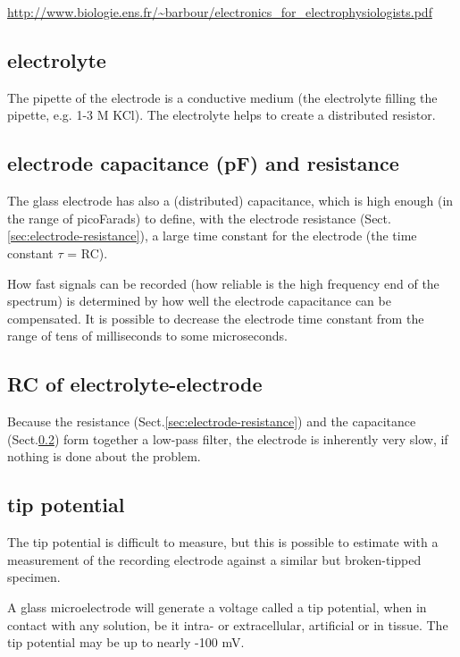 \url{http://www.biologie.ens.fr/~barbour/electronics_for_electrophysiologists.pdf}



\subsection{electrolyte}


The pipette of the electrode is a conductive medium (the electrolyte
filling the pipette, e.g. 1-3 M KCl).  The electrolyte helps to create a
distributed resistor.


\subsection{electrode capacitance (pF) and resistance}
\label{sec:electrode-capacitance}

The glass electrode has also a (distributed) capacitance, which is high enough
(in the range of picoFarads) to define, with the electrode resistance
(Sect.\ref{sec:electrode-resistance}), a large time constant for the electrode
(the time constant $\tau$ = RC).

How fast signals can be recorded (how reliable is the high frequency end of the
spectrum) is determined by how well the electrode capacitance can be
compensated. It is possible to decrease the electrode time constant from the
range of tens of milliseconds to some microseconds.



\subsection{RC of electrolyte-electrode}

Because the resistance (Sect.\ref{sec:electrode-resistance}) and the capacitance
(Sect.\ref{sec:electrode-capacitance}) form together a low-pass filter, the
electrode is inherently very slow, if nothing is done about the problem.


\subsection{tip potential}
\label{sec:tip-potential}

The tip potential is difficult to measure, but this is possible to estimate with
a measurement of the recording electrode against a similar but broken-tipped
specimen.

A glass microelectrode will generate a voltage called a tip potential, when in
contact with any solution, be it intra- or extracellular, artificial or in
tissue. The tip potential may be up to nearly -100 mV.

